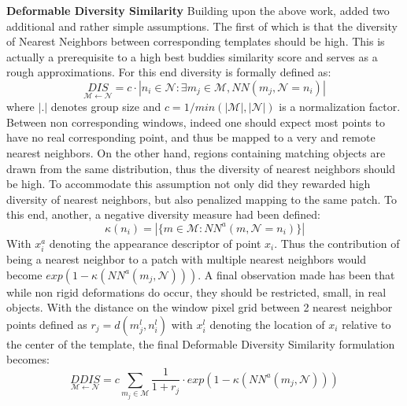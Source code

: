 \documentclass[10pt,twocolumn,letterpaper]{article}
\begin{document}
\textbf{Deformable Diversity Similarity}
Building upon the above work, \cite{talmi2017template}  added two additional and rather simple assumptions. The first of which is that the diversity of Nearest Neighbors between corresponding templates should be high. This is actually a prerequisite to a high best buddies similarity score and serves as a rough approximations. For this end diversity is formally defined as:
\begin{equation}
\underset{\mathcal{M}\leftarrow\mathcal{N}}{DIS}=c\cdot |n_i\in\mathcal{N}:\exists m_j\in\mathcal{M},NN(m_j,\mathcal{N}=n_i)|
\end{equation}
where $|{.}|$ denotes group size and $c=1/min(|\mathcal{M}|,|\mathcal{N}|)$ is a normalization factor. Between non corresponding windows, indeed one should expect most points to have no real corresponding point, and thus be mapped to a very and remote nearest neighbors.  On the other hand, regions containing matching objects are drawn from the same distribution, thus the diversity of nearest neighbors should be high.
To accommodate this assumption not only did they rewarded high diversity of nearest neighbors, but also penalized mapping to the same patch. To this end, another, a negative diversity measure had been defined:
\begin{equation}
\kappa(n_i)=|\{m\in\mathcal{M}:NN^a(m,\mathcal{N}=n_i)\}|
\end{equation}
With $x_i^a$ denoting the appearance descriptor of point $x_i$.
Thus the contribution of being a nearest neighbor to a patch with multiple nearest neighbors would become $exp(1-\kappa(NN^a(m_j,\mathcal{N})))$. 
A final observation made has been that while non rigid deformations do occur, they should be restricted, small, in real objects. With the distance on the window pixel grid between 2 nearest neighbor points defined as $r_j=d(m_j^l,n_i^l)$ with $x_i^l$ denoting the location of $x_i$ relative to the center of the template, the final Deformable Diversity Similarity formulation becomes:
\begin{equation}
\underset{\mathcal{M}\leftarrow\mathcal{N}}{DDIS}=c\sum_{m_j\in\mathcal{M}} \frac{1}{1+r_j} \cdot exp(1-\kappa (NN^a(m_j,\mathcal{N})))
\end{equation}

\end{document}
